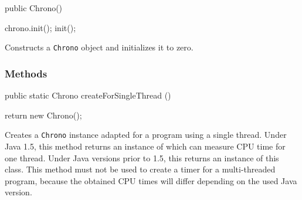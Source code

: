 \begin{code}

   public Chrono()\begin{hide} {
      chrono.init();
      init();
   }\end{hide}
\end{code}
  \begin{tabb} Constructs a \texttt{Chrono} object and
    initializes it to zero. 
  \end{tabb}


\subsubsection*{Methods}

\begin{code}

   public static Chrono createForSingleThread ()\begin{hide} {
         return new Chrono();
   }\end{hide}
\end{code}
\begin{tabb}
   Creates a \texttt{Chrono} instance adapted for a program
   using a single thread.  Under Java 1.5, this method returns
   an instance of  which can
   measure CPU time for one thread.  Under Java versions prior to
   1.5, this returns an instance of this class.
   This method must not be used to create a timer for a
   multi-threaded program, because the obtained CPU times
   will differ depending on the used Java version.
\end{tabb}
\begin{htmlonly}
\end{htmlonly}
\begin{code}
\begin{hide}
}\end{hide}
\end{code}
